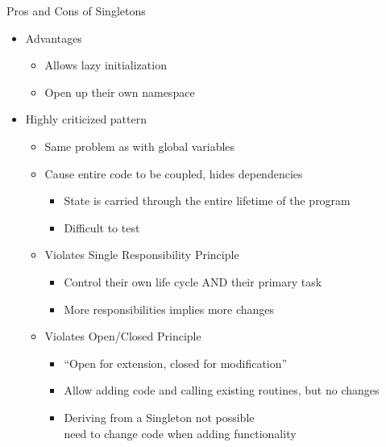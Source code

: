 \begin{frame}{Pros and Cons of Singletons}
%
\begin{itemize}
\item Advantages
	\begin{itemize}
	\item Allows lazy initialization
	\item Open up their own namespace
	\end{itemize}
\item Highly criticized pattern
	\begin{itemize}
	\item Same problem as with global variables
	\item Cause entire code to be coupled, hides dependencies
		\begin{itemize}
		\item State is carried through the entire lifetime of the program
		\item Difficult to test
		\end{itemize}
	\item Violates Single Responsibility Principle
		\begin{itemize}
		\item Control their own life cycle AND their primary task
		\item More responsibilities implies more changes
		\end{itemize}
	\item Violates Open/Closed Principle
		\begin{itemize}
		\item \enquote{Open for extension, closed for modification}
		\item Allow adding code and calling existing routines, but no changes
		\item Deriving from a Singleton not possible \\
			\Thus need to change code when adding functionality
		\end{itemize}
	 \end{itemize} 
\end{itemize}
%
\end{frame}


